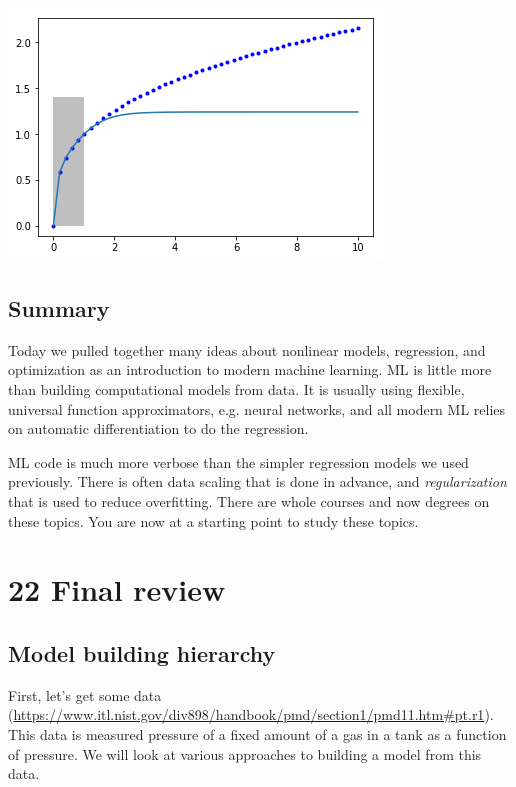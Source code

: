 \documentclass[11pt]{article}
\begin{document}
\begin{center}
\includegraphics[width=.9\linewidth]{obipy-resources/de048b6a9afb1b9e2b48e7a057512e1e-70304gWz.png}
\end{center}

\subsection{Summary}
\label{sec:org4102668}

Today we pulled together many ideas about nonlinear models, regression, and optimization as an introduction to modern machine learning. ML is little more than building computational models from data. It is usually using flexible, universal function approximators, e.g. neural networks, and all modern ML relies on automatic differentiation to do the regression.

ML code is much more verbose than the simpler regression models we used previously. There is often data scaling that is done in advance, and \emph{regularization} that is used to reduce overfitting. There are whole courses and now degrees on these topics. You are now at a starting point to study these topics.

\section{22 Final review}
\label{sec:orgaaa9db2}

\subsection{Model building hierarchy}
\label{sec:org8fb4f16}

First, let's get some data (\url{https://www.itl.nist.gov/div898/handbook/pmd/section1/pmd11.htm\#pt.r1}). This data is measured pressure of a fixed amount of a gas in a tank as a function of pressure. We will look at various approaches to building a model from this data.
\end{document}
